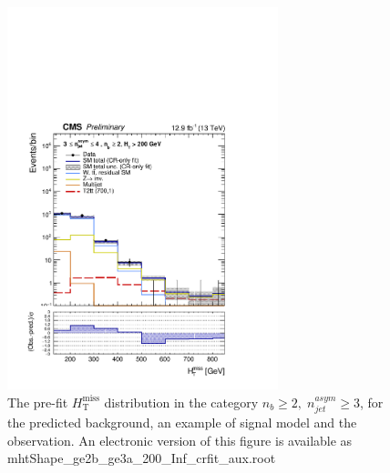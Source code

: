 \clearpage
\begin{figure}[tbhp]
    \caption{ 
    The pre-fit $H_{\mathrm{T}}^{\mathrm{miss}}$ distribution in the category $n_{b}\geq 2, \; n_{jet}^{asym} \geq 3$, 
    for the predicted background, an example of signal model and the observation.
    An electronic version of this figure is available as mhtShape\_ge2b\_ge3a\_200\_Inf\_crfit\_aux.root
    \label{fig:mhtShape_ge2b_ge3a_crfit} }
  \begin{center}
  \includegraphics[width=0.7\textwidth]{mhtShape_ge2b_ge3a_200_Inf_crfit_aux}
  \end{center}
\end{figure}


